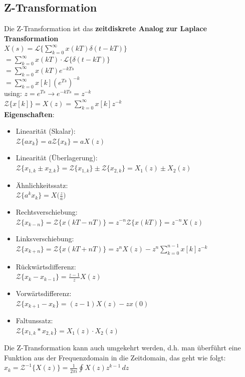 \documentclass[12pt,a4paper]{article}
\newcommand{\nl}{\\[0.1cm]}
\begin{document}
\subsection{Z-Transformation}
Die Z-Transformation ist das \textbf{zeitdiskrete Analog zur Laplace Transformation}\nl
$\displaystyle X(s) = \mathcal{L}\bigg\{\sum_{k=0}^\infty x(kT)\delta(t-kT)\bigg\}$\\
$\displaystyle= \sum_{k=0}^\infty x(kT) \cdot \mathcal{L}\{\delta(t-kT)\}$\\
$\displaystyle= \sum_{k=0}^\infty x(kT)e^{-kTs}$\\
$\displaystyle=\sum_{k=0}^\infty x[k](e^{Ts})^{-k}$\nl
using: $z=e^{Ts} \rightarrow e^{-kTs} = z^{-k}$\nl
$\displaystyle \mathcal{Z}\{x[k]\} = X(z) = \sum_{k=0}^\infty x[k]z^{-k}$\nl
\textbf{Eigenschaften}:
\begin{itemize}
\item Linearität (Skalar):\\ $\mathcal{Z}\{ax_k\} = a\mathcal{Z}\{x_k\} = aX(z)$
\item Linearität (Überlagerung):\\ $\mathcal{Z}\{x_{1,k}\pm x_{2,k}\} = \mathcal{Z}\{x_{1,k}\} \pm \mathcal{Z}\{x_{2,k}\} = X_1(z) \pm X_2(z)$
\item Ähnlichkeitssatz:\\ $\mathcal{Z}\{a^kx_k\}=X\big(\frac{z}{a}\big)$
\item Rechtsverschiebung:\\ $\displaystyle \mathcal{Z}\{x_{k-n}\} = \mathcal{Z}\{x(kT-nT)\} = z^{-n}\mathcal{Z}\{x(kT)\}=z^{-n}X(z)$
\item Linksverschiebung:\\ $\displaystyle \mathcal{Z}\{x_{k+n}\} = \mathcal{Z}\{x(kT+nT)\}= z^nX(z)-z^n \sum_{k=0}^{n-1} x[k]z^{-k}$
\item Rückwärtsdifferenz:\\ $\mathcal{Z}\{x_k-x_{k-1}\} = \frac{z-1}{z}X(z)$
\item Vorwärtsdifferenz:\\ $\mathcal{Z}\{x_{k+1}-x_k\} = (z-1)X(z)-zx(0)$
\item Faltunssatz:\\ $\mathcal{Z}\{x_{1,k}\ast x_{2,k}\} = X_1(z)\cdot X_2(z)$
\end{itemize}

Die Z-Transformation kann auch umgekehrt werden, d.h. man überführt eine Funktion aus der Frequenzdomain in die Zeitdomain, das geht wie folgt:\nl
$\displaystyle x_k = \mathcal{Z}^{-1}\{X(z)\} = \frac{1}{2\pi i} \oint X(z)z^{k-1}\, dz$
\end{document}
